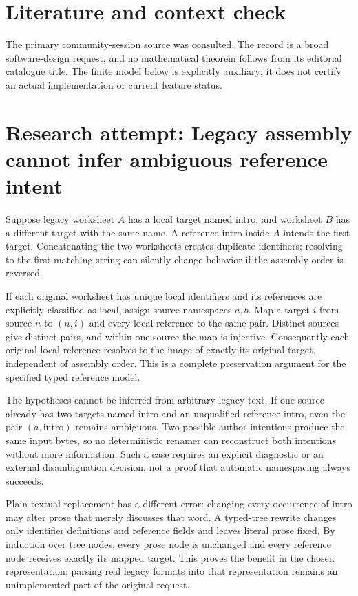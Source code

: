 \documentclass[11pt]{article}
\begin{document}
\section{Literature and context check}
The primary community-session source was consulted. The record is a broad software-design request, and no mathematical theorem follows from its editorial catalogue title. The finite model below is explicitly auxiliary; it does not certify an actual implementation or current feature status.
\section{Research attempt: Legacy assembly cannot infer ambiguous reference intent}
Suppose legacy worksheet $A$ has a local target named intro, and worksheet $B$ has a different target with the same name. A reference intro inside $A$ intends the first target. Concatenating the two worksheets creates duplicate identifiers; resolving to the first matching string can silently change behavior if the assembly order is reversed.

If each original worksheet has unique local identifiers and its references are explicitly classified as local, assign source namespaces $a,b$. Map a target $i$ from source $n$ to $(n,i)$ and every local reference to the same pair. Distinct sources give distinct pairs, and within one source the map is injective. Consequently each original local reference resolves to the image of exactly its original target, independent of assembly order. This is a complete preservation argument for the specified typed reference model.

The hypotheses cannot be inferred from arbitrary legacy text. If one source already has two targets named intro and an unqualified reference intro, even the pair $(a,\text{intro})$ remains ambiguous. Two possible author intentions produce the same input bytes, so no deterministic renamer can reconstruct both intentions without more information. Such a case requires an explicit diagnostic or an external disambiguation decision, not a proof that automatic namespacing always succeeds.

Plain textual replacement has a different error: changing every occurrence of intro may alter prose that merely discusses that word. A typed-tree rewrite changes only identifier definitions and reference fields and leaves literal prose fixed. By induction over tree nodes, every prose node is unchanged and every reference node receives exactly its mapped target. This proves the benefit in the chosen representation; parsing real legacy formats into that representation remains an unimplemented part of the original request.
\end{document}
